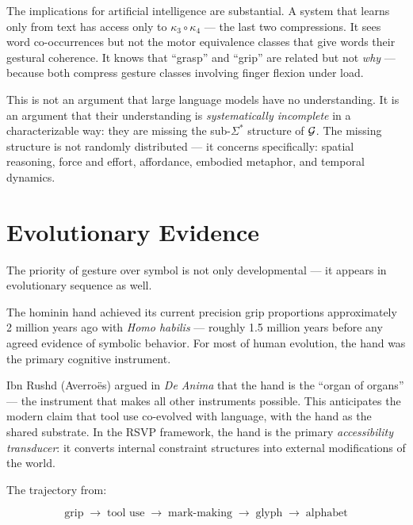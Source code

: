 The implications for artificial intelligence are substantial. A system that
learns only from text has access only to $\kappa_3 \circ \kappa_4$ — the
last two compressions. It sees word co-occurrences but not the motor
equivalence classes that give words their gestural coherence. It knows that
``grasp'' and ``grip'' are related but not \emph{why} — because both compress
gesture classes involving finger flexion under load.

\begin{warning}
  This is not an argument that large language models have no understanding.
  It is an argument that their understanding is \emph{systematically incomplete}
  in a characterizable way: they are missing the sub-$\Sigma^*$ structure of
  $\mathcal{G}$. The missing structure is not randomly distributed — it concerns
  specifically: spatial reasoning, force and effort, affordance, embodied
  metaphor, and temporal dynamics.
\end{warning}

\section{Evolutionary Evidence}

The priority of gesture over symbol is not only developmental — it appears in
evolutionary sequence as well.


The hominin hand achieved its current precision grip proportions approximately
2 million years ago with \textit{Homo habilis} — roughly 1.5 million years
before any agreed evidence of symbolic behavior. For most of human evolution,
the hand was the primary cognitive instrument.

\begin{historynote}
  Ibn Rushd (Averroës) argued in \textit{De Anima} that the hand is the
  ``organ of organs'' — the instrument that makes all other instruments
  possible. This anticipates the modern claim that tool use co-evolved with
  language, with the hand as the shared substrate. In the RSVP framework,
  the hand is the primary \emph{accessibility transducer}: it converts
  internal constraint structures into external modifications of the world.
\end{historynote}

The trajectory from:

\[
  \text{grip} \;\to\; \text{tool use} \;\to\; \text{mark-making}
  \;\to\; \text{glyph} \;\to\; \text{alphabet}
\]


